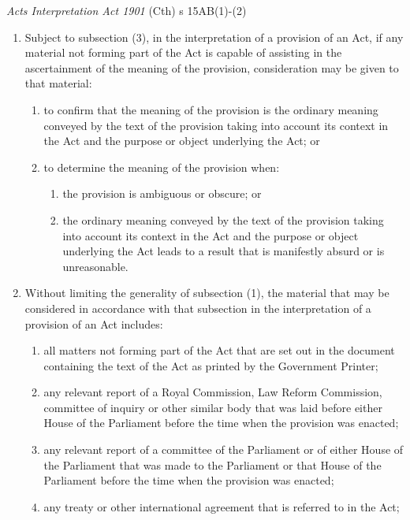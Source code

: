 \begin{statutedetails}{\textit{Acts Interpretation Act 1901} (Cth) s 15AB(1)-(2)}
    \flushleft
    \begin{enumerate}[label=(\arabic*)]
        \item Subject to subsection (3), in the interpretation of a provision of an Act, if any material not forming part of the Act is capable of assisting in the ascertainment of the meaning of the provision, consideration may be given to that material:
        \begin{enumerate}[label=(\alph*)]
            \item to confirm that the meaning of the provision is the ordinary meaning conveyed by the text of the provision taking into account its context in the Act and the purpose or object underlying the Act; or
            \item to determine the meaning of the provision when:
            \begin{enumerate}[label=(\roman*)]
                \item the provision is ambiguous or obscure; or
                \item the ordinary meaning conveyed by the text of the provision taking into account its context in the Act and the purpose or object underlying the Act leads to a result that is manifestly absurd or is unreasonable.
            \end{enumerate}
        \end{enumerate}
        \item Without limiting the generality of subsection (1), the material that may be considered in accordance with that subsection in the interpretation of a provision of an Act includes:
        \begin{enumerate}[label=(\alph*)]
            \item all matters not forming part of the Act that are set out in the document containing the text of the Act as printed by the Government Printer;
            \item any relevant report of a Royal Commission, Law Reform Commission, committee of inquiry or other similar body that was laid before either House of the Parliament before the time when the provision was enacted;
            \item any relevant report of a committee of the Parliament or of either House of the Parliament that was made to the Parliament or that House of the Parliament before the time when the provision was enacted;
            \item any treaty or other international agreement that is referred to in the Act;

\end{enumerate}
\end{enumerate}
\end{statutedetails}
